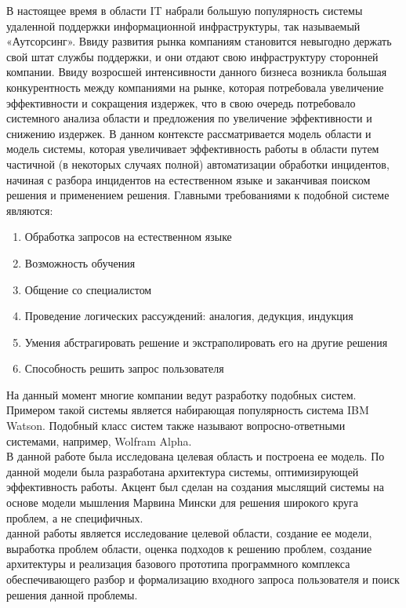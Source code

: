 {\actuality}
В настоящее время в области IT набрали большую популярность системы удаленной поддержки информационной инфраструктуры, так называемый «Аутсорсинг». Ввиду развития рынка компаниям становится невыгодно держать свой штат службы поддержки, и они отдают свою инфраструктуру сторонней компании.
Ввиду возросшей интенсивности данного бизнеса возникла большая конкурентность между компаниями на рынке, которая потребовала увеличение эффективности и сокращения издержек, что в свою очередь потребовало системного анализа области и предложения по увеличение эффективности и снижению издержек. В данном контексте рассматривается модель области и модель системы, которая увеличивает эффективность работы в области путем частичной (в некоторых случаях полной) автоматизации обработки инцидентов, начиная с разбора инцидентов на естественном языке и заканчивая поиском решения и применением решения. 
Главными требованиями к подобной системе являются:
\begin{enumerate}
  \item Обработка запросов на естественном языке
  \item Возможность обучения
  \item Общение со специалистом
  \item Проведение логических рассуждений: аналогия, дедукция, индукция
  \item Умения абстрагировать решение и экстраполировать его на другие решения
  \item Способность решить запрос пользователя
\end{enumerate}

На данный момент многие компании ведут разработку подобных систем. Примером такой системы является набирающая популярность система IBM Watson. Подобный класс систем также называют вопросно-ответными системами, например, Wolfram Alpha. \\
В данной работе была исследована целевая область и построена ее модель. По данной модели была разработана архитектура системы, оптимизирующей эффективность работы. 
 Акцент был сделан на создания мыслящий системы на основе модели мышления Марвина Мински для решения широкого круга проблем, а не специфичных. \\
{\aim} данной работы является исследование целевой области, создание ее модели, выработка проблем области, оценка подходов к решению проблем,  создание архитектуры и реализация базового прототипа программного комплекса обеспечивающего разбор и формализацию входного запроса пользователя и поиск решения данной проблемы.

